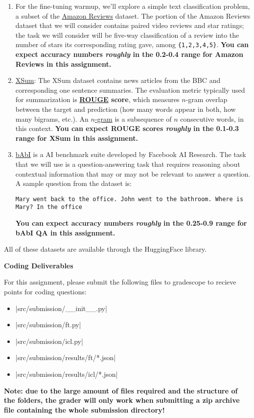 \begin{enumerate}
    \item For the fine-tuning warmup, we'll explore a simple text classification problem, a subset of the \href{https://huggingface.co/datasets/amazon\_us\_reviews}{Amazon Reviews} dataset. The portion of the Amazon Reviews dataset that we will consider contains paired video reviews and star ratings; the task we will consider will be five-way classification of a review into the number of stars its corresponding rating gave, among \texttt{\{1,2,3,4,5\}}. \textbf{You can expect accuracy numbers \textit{roughly} in the 0.2-0.4 range for Amazon Reviews in this assignment.}
    \item \href{https://huggingface.co/datasets/xsum}{XSum}: The XSum dataset contains news articles from the BBC and corresponding one sentence summaries. The evaluation metric typically used for summarization is \textbf{\href{https://en.wikipedia.org/wiki/ROUGE_(metric)}{ROUGE} score}, which measures $n$-gram overlap between the target and prediction (how many words appear in both, how many bigrams, etc.). An \href{https://en.wikipedia.org/wiki/N-gram#Examples}{$n$-gram} is a subsequence of $n$ consecutive words, in this context.  \textbf{You can expect ROUGE scores \textit{roughly} in the 0.1-0.3 range for XSum in this assignment.}
    \item \href{https://research.facebook.com/downloads/babi/}{bAbI} is a AI benchmark suite developed by Facebook AI Research. The task that we will use is a question-answering task that requires reasoning about contextual information that may or may not be relevant to answer a question. A sample question from the dataset is:
    
    \texttt{Mary went back to the office. John went to the bathroom. Where is Mary? In the office}
    
    \textbf{You can expect accuracy numbers \textit{roughly} in the 0.25-0.9 range for bAbI QA in this assignment.}
\end{enumerate}

All of these datasets are available through the HuggingFace library.

\clearpage

\textbf{Coding Deliverables}

For this assignment, please submit the following files to gradescope to recieve points for coding questions:
\begin{itemize}
    \item |src/submission/__init__.py|
    \item |src/submission/ft.py|
    \item |src/submission/icl.py|
    \item |src/submission/results/ft/*.json|
    \item |src/submission/results/icl/*.json|
\end{itemize}

\textbf{Note: due to the large amount of files required and the structure of the folders, the grader will only work when submitting a zip archive file containing the whole submission directory!}